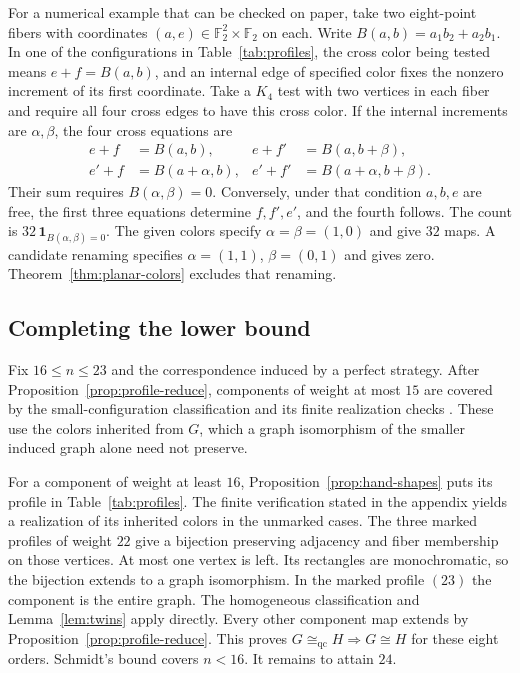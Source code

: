 \documentclass[11pt,reqno]{amsart}
\numberwithin{equation}{section}
\theoremstyle{definition}
\newcommand{\qc}{\mathrm{qc}}
\begin{document}
For a numerical example that can be checked on paper, take two eight-point fibers with coordinates $(a,e)\in\mathbb F_2^2\times\mathbb F_2$ on each. Write $B(a,b)=a_1b_2+a_2b_1$. In one of the configurations in Table~\ref{tab:profiles}, the cross color being tested means $e+f=B(a,b)$, and an internal edge of specified color fixes the nonzero increment of its first coordinate. Take a $K_4$ test with two vertices in each fiber and require all four cross edges to have this cross color. If the internal increments are $\alpha,\beta$, the four cross equations are
\[
 \begin{aligned}
 e+f&=B(a,b),              & e+f'&=B(a,b+\beta),\\
 e'+f&=B(a+\alpha,b), & e'+f'&=B(a+\alpha,b+\beta).
 \end{aligned}
\]
Their sum requires $B(\alpha,\beta)=0$. Conversely, under that condition $a,b,e$ are free, the first three equations determine $f,f',e'$, and the fourth follows. The count is $32\,\mathbf 1_{B(\alpha,\beta)=0}$. The given colors specify $\alpha=\beta=(1,0)$ and give $32$ maps. A candidate renaming specifies $\alpha=(1,1)$, $\beta=(0,1)$ and gives zero. Theorem~\ref{thm:planar-colors} excludes that renaming.

\subsection{Completing the lower bound}
Fix $16\le n\le23$ and the correspondence induced by a perfect strategy. After Proposition~\ref{prop:profile-reduce}, components of weight at most $15$ are covered by the small-configuration classification and its finite realization checks \cite[\S2.1]{ZivAv}. These use the colors inherited from $G$, which a graph isomorphism of the smaller induced graph alone need not preserve.

For a component of weight at least $16$, Proposition~\ref{prop:hand-shapes} puts its profile in Table~\ref{tab:profiles}. The finite verification stated in the appendix yields a realization of its inherited colors in the unmarked cases. The three marked profiles of weight $22$ give a bijection preserving adjacency and fiber membership on those vertices. At most one vertex is left. Its rectangles are monochromatic, so the bijection extends to a graph isomorphism. In the marked profile $(23)$ the component is the entire graph. The homogeneous classification and Lemma~\ref{lem:twins} apply directly. Every other component map extends by Proposition~\ref{prop:profile-reduce}. This proves $G\cong_{\qc}H\Rightarrow G\cong H$ for these eight orders. Schmidt's bound covers $n<16$. It remains to attain $24$.
\end{document}
